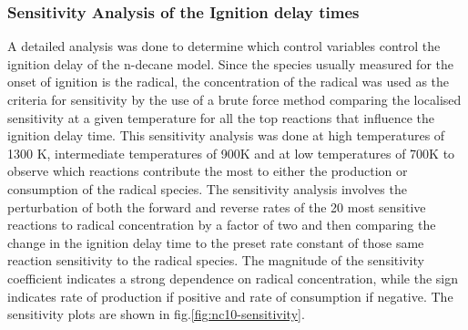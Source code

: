 \subsubsection{Sensitivity Analysis of the Ignition delay times}
A detailed analysis was done to determine which control variables control the ignition delay of the n-decane model. Since the species usually measured for the onset of ignition is the  radical, the concentration of the  radical was used as the criteria for sensitivity by the use of a brute force method comparing the localised sensitivity at a given temperature for all the top reactions that influence the ignition delay time. This sensitivity analysis was done at high temperatures of 1300 K, intermediate temperatures of 900K and at low temperatures of 700K to observe which reactions contribute the most to either the production or consumption of the  radical species. The sensitivity analysis involves the perturbation of both the forward and reverse rates of the 20 most sensitive reactions to  radical concentration by a factor of two and then comparing the change in the ignition delay time to the preset rate constant of those same reaction sensitivity to the  radical species. The magnitude of the sensitivity coefficient indicates a strong dependence on  radical concentration, while the sign indicates rate of production if positive and rate of consumption if negative. The sensitivity plots are shown in fig.\ref{fig:nc10-sensitivity}.

